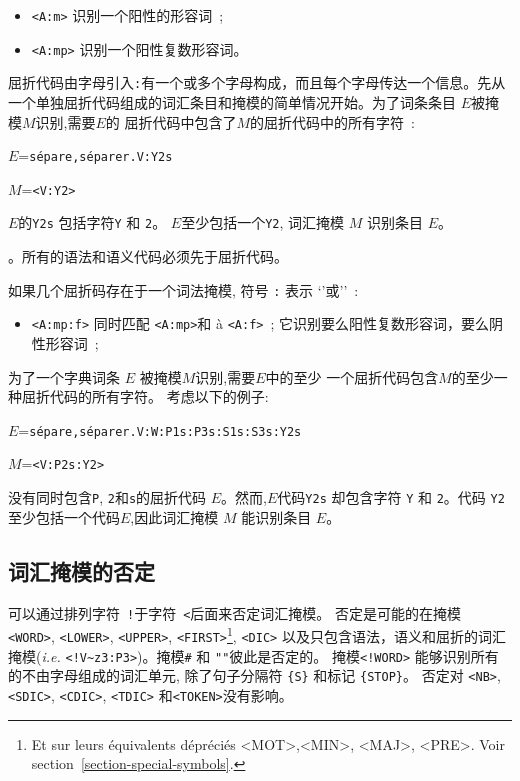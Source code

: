 \begin{itemize}
  \item \verb+<A:m>+ 识别一个阳性的形容词~;
  \item \verb+<A:mp>+ 识别一个阳性复数形容词。
\end{itemize}

\noindent 屈折代码由字母引入\verb+:+有一个或多个字母构成，而且每个字母传达一个信息。先从一个单独屈折代码组成的词汇条目和掩模的简单情况开始。为了词条条目 $E$被掩模$M$识别,需要$E$的
屈折代码中包含了$M$的屈折代码中的所有字符~:

\bigskip
$E$=\verb$sépare,séparer.V:Y2s$

$M$=\verb$<V:Y2>$

\bigskip
\noindent $E$的\verb+Y2s+ 包括字符\verb+Y+ 和 \verb+2+。 $E$至少包括一个\verb+Y2+, 词汇掩模 $M$ 识别条目 $E$。

\bigskip
{}。所有的语法和语义代码必须先于屈折代码。 

\bigskip
\noindent 如果几个屈折码存在于一个词法掩模, 符号 \verb+:+ 表示 `'或''~:

\begin{itemize}
  \item \verb+<A:mp:f>+ 同时匹配 \verb+<A:mp>+和 à \verb+<A:f>+~; 它识别要么阳性复数形容词，要么阴性形容词~;
\end{itemize}

\noindent 为了一个字典词条 $E$ 被掩模$M$识别,需要$E$中的至少
一个屈折代码包含$M$的至少一种屈折代码的所有字符。
考虑以下的例子:

\bigskip
$E$=\verb$sépare,séparer.V:W:P1s:P3s:S1s:S3s:Y2s$

$M$=\verb$<V:P2s:Y2>$

\bigskip
\noindent 没有同时包含\verb+P+, \verb+2+和\verb+s+的屈折代码
$E$。然而,$E$代码\verb+Y2s+ 却包含字符 \verb+Y+ 和 \verb+2+。代码 \verb+Y2+ 至少包括一个代码$E$,因此词汇掩模
$M$ 能识别条目 $E$。


\subsection{词汇掩模的否定}
可以通过排列字符~\verb+!+于字符~\verb+<+后面来否定词汇掩模。  否定是可能的在掩模 \verb+<WORD>+, \verb+<LOWER>+,
\verb+<UPPER>+,
\verb+<FIRST>+\footnote{Et sur leurs équivalents dépréciés  <MOT>,<MIN>, <MAJ>,
<PRE>. Voir section~\ref{section-special-symbols}.},
\verb+<DIC>+  以及只包含语法，语义和屈折的词汇掩模(\textit{i.e.} \verb$<!V~z3:P3>$)。掩模\verb+#+ 和 \verb+""+彼此是否定的。 
\index{\verb+#+}
掩模\verb$<!WORD>$ 能够识别所有的不由字母组成的词汇单元, 除了句子分隔符 \verb+{S}+ 和标记 \verb+{STOP}+。
否定对 \verb+<NB>+, \verb+<SDIC>+, \verb+<CDIC>+, \verb+<TDIC>+ 和\verb+<TOKEN>+没有影响。

